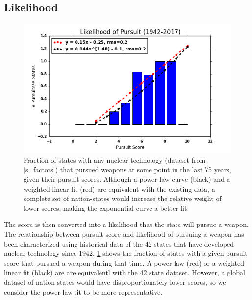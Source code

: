  \subsection{Likelihood}

\begin{figure}%
\begin{center}
\includegraphics[scale=0.8]{./figs/pe_likely.png}
\end{center}
\caption{Fraction of states with any nuclear technology (dataset from \ref{s_factors}) that pursued weapons at some point in the last 75 years, given their pursuit scores. Although a power-law curve (black) and a weighted linear fit (red) are equivalent with the existing data, a complete set of nation-states would increase the relative weight of lower scores, making the exponential curve a better fit.}
\label{fig:likely}
\end{figure}
 
The score is then converted into a likelihood that the state will pursue a weapon. The relationship between pursuit score and likelihood of pursuing a weapon has been characterized using historical data of the 42 states that have developed nuclear technology since 1942.  \ref{fig:likely} shows the fraction of states with a given pursuit score that pursued a weapon during that time. A power-law (red) or a weighted linear fit (black) are are equivalentl with the 42 state dataset. However, a global dataset of nation-states would have disproportionately lower scores, so we consider the power-law fit to be more representative.


